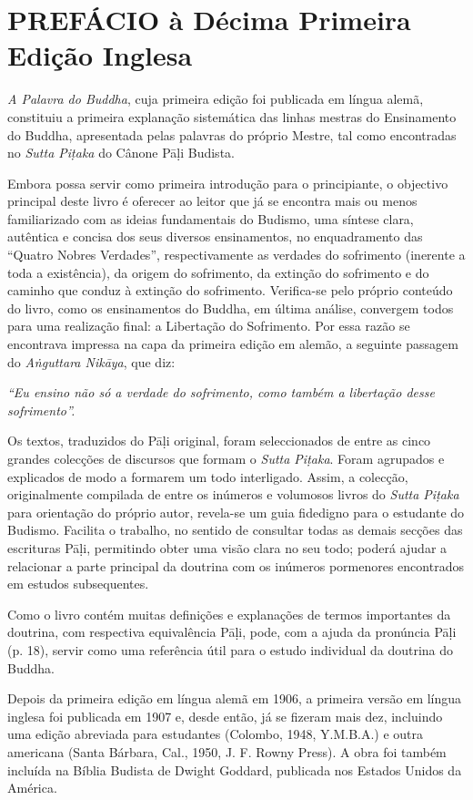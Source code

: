 \chapter{PREFÁCIO à Décima Primeira Edição Inglesa}

\emph{A Palavra do Buddha}, cuja primeira edição foi publicada em língua alemã, constituiu a primeira explanação sistemática das linhas mestras do Ensinamento do Buddha, apresentada pelas palavras do próprio Mestre, tal como encontradas no \emph{Sutta Piṭaka} do Cânone Pāḷi Budista.

Embora possa servir como primeira introdução para o principiante, o objectivo principal deste livro é oferecer ao leitor que já se encontra mais ou menos familiarizado com as ideias fundamentais do Budismo, uma síntese clara, autêntica e concisa dos seus diversos ensinamentos, no enquadramento das ``Quatro Nobres Verdades'', respectivamente as verdades do sofrimento (inerente a toda a existência), da origem do sofrimento, da extinção do sofrimento e do caminho que conduz à extinção do sofrimento. Verifica-se pelo próprio conteúdo do livro, como os ensinamentos do Buddha, em última análise, convergem todos para uma realização final: a Libertação do Sofrimento. Por essa razão se encontrava impressa na capa da primeira edição em alemão, a seguinte passagem do \emph{Aṅguttara Nikāya}, que diz:

\emph{``Eu ensino não só a verdade do sofrimento, como também a libertação desse sofrimento''.}

Os textos, traduzidos do Pāḷi original, foram seleccionados de entre as cinco grandes colecções de discursos que formam o \emph{Sutta Piṭaka}. Foram agrupados e explicados de modo a formarem um todo interligado. Assim, a colecção, originalmente compilada de entre os inúmeros e volumosos livros do \emph{Sutta Piṭaka} para orientação do próprio autor, revela-se um guia fidedigno para o estudante do Budismo. Facilita o trabalho, no sentido de consultar todas as demais secções das escrituras Pāḷi, permitindo obter uma visão clara no seu todo; poderá ajudar a relacionar a parte principal da doutrina com os inúmeros pormenores encontrados em estudos subsequentes.

Como o livro contém muitas definições e explanações de termos importantes da doutrina, com respectiva equivalência Pāḷi, pode, com a ajuda da pronúncia Pāḷi (p. 18), servir como uma referência útil para o estudo individual da doutrina do Buddha.

Depois da primeira edição em língua alemã em 1906, a primeira versão em língua inglesa foi publicada em 1907 e, desde então, já se fizeram mais dez, incluindo uma edição abreviada para estudantes (Colombo, 1948, Y.M.B.A.) e outra americana (Santa Bárbara, Cal., 1950, J. F. Rowny Press). A obra foi também incluída na Bíblia Budista de Dwight Goddard, publicada nos Estados Unidos da América.

